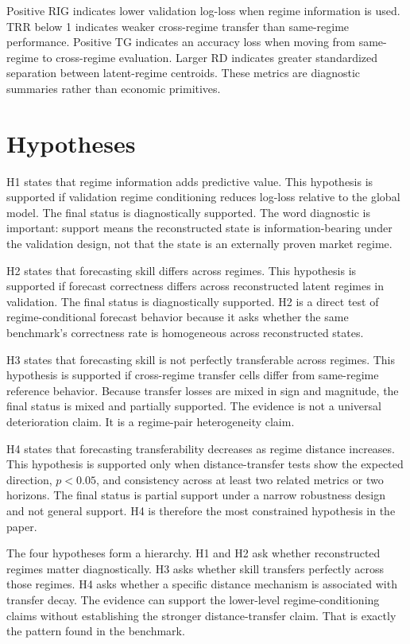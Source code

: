 \documentclass[12pt,a4paper]{article}
\begin{document}
Positive RIG indicates lower validation log-loss when regime information is used. TRR below 1 indicates weaker cross-regime transfer than same-regime performance. Positive TG indicates an accuracy loss when moving from same-regime to cross-regime evaluation. Larger RD indicates greater standardized separation between latent-regime centroids. These metrics are diagnostic summaries rather than economic primitives.

\section{Hypotheses}

H1 states that regime information adds predictive value. This hypothesis is supported if validation regime conditioning reduces log-loss relative to the global model. The final status is diagnostically supported. The word diagnostic is important: support means the reconstructed state is information-bearing under the validation design, not that the state is an externally proven market regime.

H2 states that forecasting skill differs across regimes. This hypothesis is supported if forecast correctness differs across reconstructed latent regimes in validation. The final status is diagnostically supported. H2 is a direct test of regime-conditional forecast behavior because it asks whether the same benchmark's correctness rate is homogeneous across reconstructed states.

H3 states that forecasting skill is not perfectly transferable across regimes. This hypothesis is supported if cross-regime transfer cells differ from same-regime reference behavior. Because transfer losses are mixed in sign and magnitude, the final status is mixed and partially supported. The evidence is not a universal deterioration claim. It is a regime-pair heterogeneity claim.

H4 states that forecasting transferability decreases as regime distance increases. This hypothesis is supported only when distance-transfer tests show the expected direction, \(p < 0.05\), and consistency across at least two related metrics or two horizons. The final status is partial support under a narrow robustness design and not general support. H4 is therefore the most constrained hypothesis in the paper.

The four hypotheses form a hierarchy. H1 and H2 ask whether reconstructed regimes matter diagnostically. H3 asks whether skill transfers perfectly across those regimes. H4 asks whether a specific distance mechanism is associated with transfer decay. The evidence can support the lower-level regime-conditioning claims without establishing the stronger distance-transfer claim. That is exactly the pattern found in the benchmark.
\end{document}
